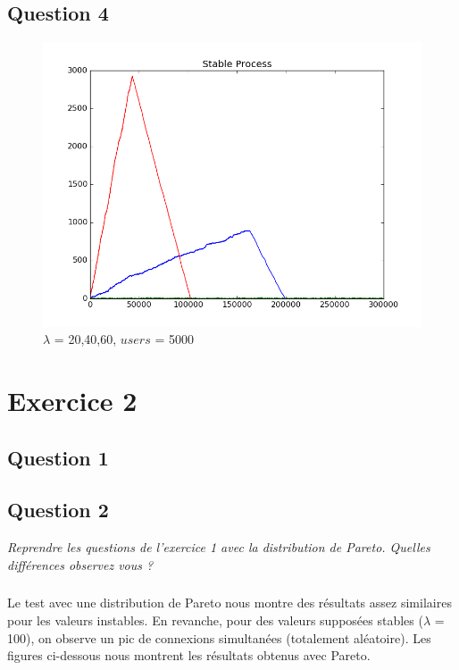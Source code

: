 \documentclass[12pt]{article}
\begin{document}
\subsection{Question 4}
\begin{figure}[H]
\centering
\includegraphics[scale=0.50]{3lambda.png}
\caption{\label{fig:rf_taille_noeud} $\lambda$ = 20,40,60, $users$ = 5000}
\end{figure}


\section{Exercice 2}
\subsection{Question 1}
\subsection{Question 2}
\textit{Reprendre les questions de l’exercice 1 avec la distribution de Pareto. Quelles différences observez vous ?}

\subsubsection{}
Le test avec une distribution de Pareto nous montre des résultats assez similaires pour les valeurs instables. En revanche, pour des valeurs supposées stables ($\lambda$ = 100), on observe un pic de connexions simultanées (totalement aléatoire). Les figures ci-dessous nous montrent les résultats obtenus avec Pareto.
\end{document}
